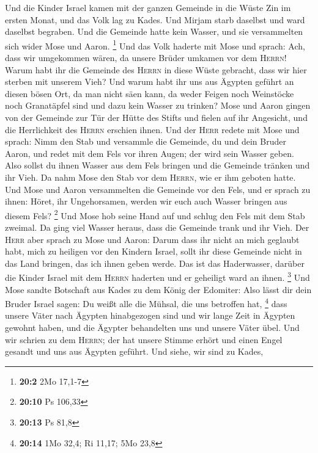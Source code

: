 Und die Kinder Israel kamen mit der ganzen Gemeinde in die Wüste Zin im
ersten Monat, und das Volk lag zu Kades. Und Mirjam starb daselbst und
ward daselbst begraben.  Und die Gemeinde hatte kein
Wasser, und sie versammelten sich wider Mose und Aaron. \footnote{\textbf{20:2}
  2Mo 17,1-7}  Und das Volk haderte mit Mose und sprach:
Ach, dass wir umgekommen wären, da unsere Brüder umkamen vor dem
\textsc{Herrn}!  Warum habt ihr die Gemeinde des
\textsc{Herrn} in diese Wüste gebracht, dass wir hier sterben mit
unserem Vieh?  Und warum habt ihr uns aus Ägypten geführt
an diesen bösen Ort, da man nicht säen kann, da weder Feigen noch
Weinstöcke noch Granatäpfel sind und dazu kein Wasser zu trinken?
 Mose und Aaron gingen von der Gemeinde zur Tür der Hütte
des Stifts und fielen auf ihr Angesicht, und die Herrlichkeit des
\textsc{Herrn} erschien ihnen.  Und der \textsc{Herr}
redete mit Mose und sprach:  Nimm den Stab und versammle
die Gemeinde, du und dein Bruder Aaron, und redet mit dem Fels vor ihren
Augen; der wird sein Wasser geben. Also sollst du ihnen Wasser aus dem
Fels bringen und die Gemeinde tränken und ihr Vieh.  Da
nahm Mose den Stab vor dem \textsc{Herrn}, wie er ihm geboten hatte.
 Und Mose und Aaron versammelten die Gemeinde vor den
Fels, und er sprach zu ihnen: Höret, ihr Ungehorsamen, werden wir euch
auch Wasser bringen aus diesem Fels? \footnote{\textbf{20:10} Ps 106,33}
 Und Mose hob seine Hand auf und schlug den Fels mit dem
Stab zweimal. Da ging viel Wasser heraus, dass die Gemeinde trank und
ihr Vieh.  Der \textsc{Herr} aber sprach zu Mose und
Aaron: Darum dass ihr nicht an mich geglaubt habt, mich zu heiligen vor
den Kindern Israel, sollt ihr diese Gemeinde nicht in das Land bringen,
das ich ihnen geben werde.  Das ist das Haderwasser,
darüber die Kinder Israel mit dem \textsc{Herrn} haderten und er
geheiligt ward an ihnen. \footnote{\textbf{20:13} Ps 81,8}
 Und Mose sandte Botschaft aus Kades zu dem König der
Edomiter: Also lässt dir dein Bruder Israel sagen: Du weißt alle die
Mühsal, die uns betroffen hat, \footnote{\textbf{20:14} 1Mo 32,4; Ri
  11,17; 5Mo 23,8}  dass unsere Väter nach Ägypten
hinabgezogen sind und wir lange Zeit in Ägypten gewohnt haben, und die
Ägypter behandelten uns und unsere Väter übel.  Und wir
schrien zu dem \textsc{Herrn}; der hat unsere Stimme erhört und einen
Engel gesandt und uns aus Ägypten geführt. Und siehe, wir sind zu Kades,
